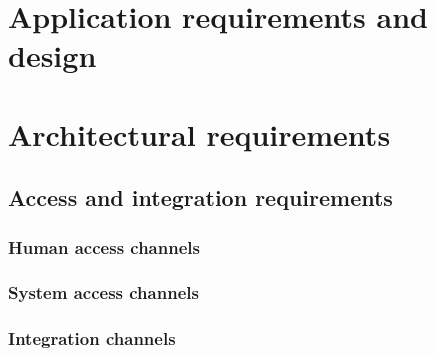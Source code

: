 \documentclass[a4paper,12pt,titlepage]{article}
\begin{document}


\tableofcontents
\newpage


\section{Application requirements and design}


\newpage

\newpage

\newpage

\newpage

\newpage



\newpage
\section{Architectural requirements}
	
	\subsection{Access and integration requirements}
			\subsubsection{Human access channels}	
				
			\subsubsection{System access channels}
					
			\subsubsection{Integration channels}
				
				
\end{document}

